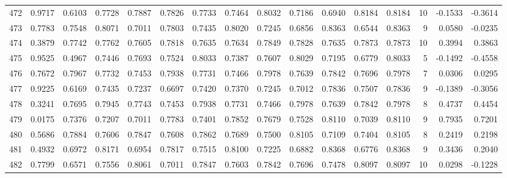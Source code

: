\begin{tabular}{lrrrrrrrrrrrrrrr}
472 &      0.9717 &  0.6103 &  0.7728 &  0.7887 &  0.7826 &  0.7733 &  0.7464 &  0.8032 &  0.7186 &  0.6940 &   0.8184 &     0.8184 &     10 &                   -0.1533 &                    -0.3614 \\
473 &      0.7783 &  0.7548 &  0.8071 &  0.7011 &  0.7803 &  0.7435 &  0.8020 &  0.7245 &  0.6856 &  0.8363 &   0.6544 &     0.8363 &      9 &                    0.0580 &                    -0.0235 \\
474 &      0.3879 &  0.7742 &  0.7762 &  0.7605 &  0.7818 &  0.7635 &  0.7634 &  0.7849 &  0.7828 &  0.7635 &   0.7873 &     0.7873 &     10 &                    0.3994 &                     0.3863 \\
475 &      0.9525 &  0.4967 &  0.7446 &  0.7693 &  0.7524 &  0.8033 &  0.7387 &  0.7607 &  0.8029 &  0.7195 &   0.6779 &     0.8033 &      5 &                   -0.1492 &                    -0.4558 \\
476 &      0.7672 &  0.7967 &  0.7732 &  0.7453 &  0.7938 &  0.7731 &  0.7466 &  0.7978 &  0.7639 &  0.7842 &   0.7696 &     0.7978 &      7 &                    0.0306 &                     0.0295 \\
477 &      0.9225 &  0.6169 &  0.7435 &  0.7237 &  0.6697 &  0.7420 &  0.7370 &  0.7245 &  0.7012 &  0.7836 &   0.7507 &     0.7836 &      9 &                   -0.1389 &                    -0.3056 \\
478 &      0.3241 &  0.7695 &  0.7945 &  0.7743 &  0.7453 &  0.7938 &  0.7731 &  0.7466 &  0.7978 &  0.7639 &   0.7842 &     0.7978 &      8 &                    0.4737 &                     0.4454 \\
479 &      0.0175 &  0.7376 &  0.7207 &  0.7011 &  0.7783 &  0.7401 &  0.7852 &  0.7679 &  0.7528 &  0.8110 &   0.7039 &     0.8110 &      9 &                    0.7935 &                     0.7201 \\
480 &      0.5686 &  0.7884 &  0.7606 &  0.7847 &  0.7608 &  0.7862 &  0.7689 &  0.7500 &  0.8105 &  0.7109 &   0.7404 &     0.8105 &      8 &                    0.2419 &                     0.2198 \\
481 &      0.4932 &  0.6972 &  0.8171 &  0.6954 &  0.7817 &  0.7515 &  0.8100 &  0.7225 &  0.6882 &  0.8368 &   0.6776 &     0.8368 &      9 &                    0.3436 &                     0.2040 \\
482 &      0.7799 &  0.6571 &  0.7556 &  0.8061 &  0.7011 &  0.7847 &  0.7603 &  0.7842 &  0.7696 &  0.7478 &   0.8097 &     0.8097 &     10 &                    0.0298 &                    -0.1228 \\

\end{tabular}
